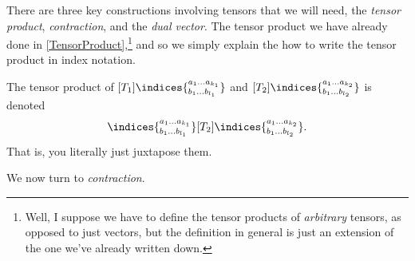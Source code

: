 There are three key constructions involving tensors that we will need, the \emph{tensor product}, \emph{contraction}, and the \emph{dual vector}.  The tensor product we have already done in \cref{TensorProduct},\footnote{Well, I suppose we have to define the tensor products of \emph{arbitrary} tensors, as opposed to just vectors, but the definition in general is just an extension of the one we've already written down.} and so we simply explain the how to write the tensor product in index notation.
\begin{important}
The tensor product of $[T_1]\indices{^{a_1\ldots a_{k_1}}_{b_1\ldots b_{l_1}}}$ and $[T_2]\indices{^{a_1\ldots a_{k_2}}_{b_1\ldots b_{l_2}}}$ is denoted
\begin{equation}
[T_1]\indices{^{a_1\ldots a_{k_1}}_{b_1\ldots b_{l_1}}}[T_2]\indices{^{a_1\ldots a_{k_2}}_{b_1\ldots b_{l_2}}}.
\end{equation}
That is, you literally just juxtapose them.
\end{important}
We now turn to \emph{contraction}.
